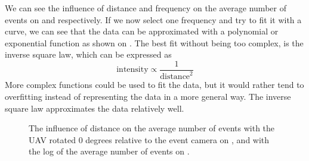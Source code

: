 We can see the influence of distance and frequency on the average number of events on
 and  respectively. If we now select one frequency and try to fit it with a curve,
we can see that the data can be approximated with a polynomial or exponential function as shown on .
The best fit without being too complex, is the inverse square law, which can be expressed as
\begin{equation}
	\text{intensity} \propto \frac{1}{\text{distance}^2}
\end{equation}
More complex functions could be used to fit the data, but it would rather tend to overfitting instead
of representing the data in a more general way. The inverse square law approximates the data relatively well.

\begin{figure}[htbp]
	\centering
	\caption{
  The influence of distance on the average number of events with the UAV rotated 0 degrees relative to the event camera on , and with the log of the average number of events on .
  }
	\label{fig:dist}
\end{figure}

